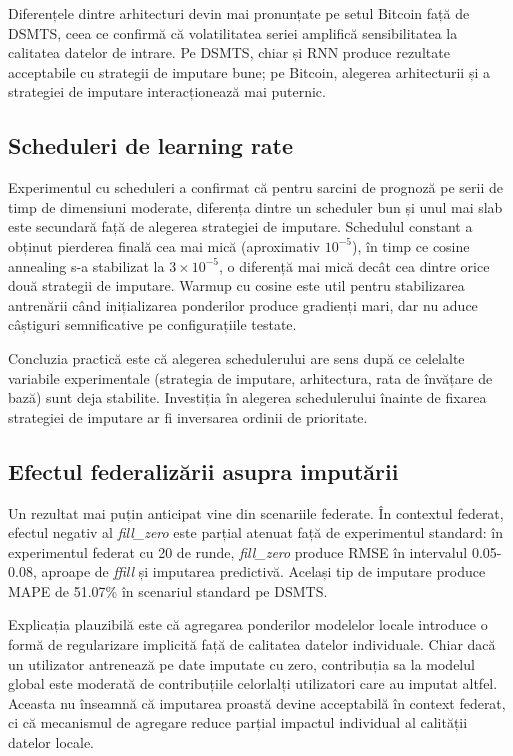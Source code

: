 Diferențele dintre arhitecturi devin mai pronunțate pe setul Bitcoin față de DSMTS, ceea ce confirmă că volatilitatea seriei amplifică sensibilitatea la calitatea datelor de intrare. Pe DSMTS, chiar și RNN produce rezultate acceptabile cu strategii de imputare bune; pe Bitcoin, alegerea arhitecturii și a strategiei de imputare interacționează mai puternic.

\subsection{Scheduleri de learning rate}

Experimentul cu scheduleri a confirmat că pentru sarcini de prognoză pe serii de timp de dimensiuni moderate, diferența dintre un scheduler bun și unul mai slab este secundară față de alegerea strategiei de imputare. Schedulul constant a obținut pierderea finală cea mai mică (aproximativ $10^{-5}$), în timp ce cosine annealing s-a stabilizat la $3 \times 10^{-5}$, o diferență mai mică decât cea dintre orice două strategii de imputare. Warmup cu cosine este util pentru stabilizarea antrenării când inițializarea ponderilor produce gradienți mari, dar nu aduce câștiguri semnificative pe configurațiile testate.

Concluzia practică este că alegerea schedulerului are sens după ce celelalte variabile experimentale (strategia de imputare, arhitectura, rata de învățare de bază) sunt deja stabilite. Investiția în alegerea schedulerului înainte de fixarea strategiei de imputare ar fi inversarea ordinii de prioritate.

\subsection{Efectul federalizării asupra imputării}

Un rezultat mai puțin anticipat vine din scenariile federate. În contextul federat, efectul negativ al \textit{fill\_zero} este parțial atenuat față de experimentul standard: în experimentul federat cu 20 de runde, \textit{fill\_zero} produce RMSE în intervalul 0.05-0.08, aproape de \textit{ffill} și imputarea predictivă. Același tip de imputare produce MAPE de 51.07\% în scenariul standard pe DSMTS.

Explicația plauzibilă este că agregarea ponderilor modelelor locale introduce o formă de regularizare implicită față de calitatea datelor individuale. Chiar dacă un utilizator antrenează pe date imputate cu zero, contribuția sa la modelul global este moderată de contribuțiile celorlalți utilizatori care au imputat altfel. Aceasta nu înseamnă că imputarea proastă devine acceptabilă în context federat, ci că mecanismul de agregare reduce parțial impactul individual al calității datelor locale.

